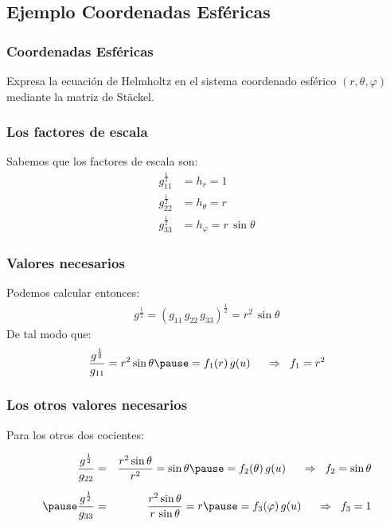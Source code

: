 \documentclass[12pt]{beamer}
\begin{document}
\subsection{Ejemplo Coordenadas Esféricas}

\begin{frame}
\frametitle{Coordenadas Esféricas}
Expresa la ecuación de Helmholtz en el sistema coordenado esférico $(r, \theta, \varphi)$ mediante la matriz de Stäckel.
\end{frame}
\begin{frame}
\frametitle{Los factores de escala}
Sabemos que los factores de escala son:
\begin{align*}
g_{11}^{\frac{1}{2}} &= h_{r} = 1 \\[0.5em] 
g_{22}^{\frac{1}{2}} &= h_{\theta} = r \\[0.5em] 
g_{33}^{\frac{1}{2}} &= h_{\varphi} = r \, \sin \theta
\end{align*}
\end{frame}
\begin{frame}
\frametitle{Valores necesarios}
Podemos calcular entonces:
\pause
\begin{align*}
g^{\frac{1}{2}} = (g_{11} \, g_{22} \, g_{33})^{\frac{1}{2}} = r^{2} \, \sin \theta
\end{align*}
\pause
De tal modo que:
\begin{eqnarray*}
\dfrac{g^{\frac{1}{2}}}{g_{11}} = r^{2} \sin \theta \pause = f_{1}(r) \, g(u) \hspace{0.5cm} \Rightarrow \hspace{0.2cm} f_{1} = r^{2}
\end{eqnarray*}
\end{frame}
\begin{frame}
\frametitle{Los otros valores necesarios}
Para los otros dos cocientes:

\begin{eqnarray*}
\dfrac{g^{\frac{1}{2}}}{g_{22}} &=& \dfrac{r^{2} \sin \theta}{r^{2}} = \sin \theta \pause = f_{2}(\theta) \, g(u) \hspace{0.5cm} \Rightarrow \hspace{0.2cm} f_{2} = \sin \theta \\[0.5em] \pause
\dfrac{g^{\frac{1}{2}}}{g_{33}} &=& \dfrac{r^{2} \sin \theta}{r \, \sin \theta} = r \pause = f_{3}(\varphi) \, g(u) \hspace{0.5cm} \Rightarrow \hspace{0.2cm} f_{3} = 1
\end{eqnarray*}
\end{frame}
\end{document}
